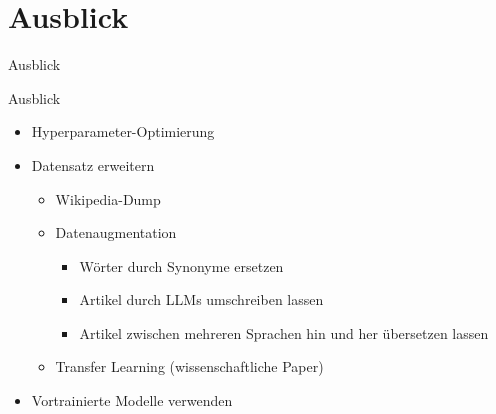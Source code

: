 \documentclass[aspectratio=169]{beamer} %
\begin{document}
\section{Ausblick}
\begin{frame}{Ausblick}
    \begin{block}{Ausblick}
        \begin{itemize}
            \item Hyperparameter-Optimierung

            \item Datensatz erweitern
            \begin{itemize}
                \item Wikipedia-Dump
                
                \item Datenaugmentation
                \begin{itemize}
                    \item W\"orter durch Synonyme ersetzen

                    \item Artikel durch LLMs umschreiben lassen

                    \item Artikel zwischen mehreren Sprachen hin und her \"ubersetzen lassen
                \end{itemize}
                
                \item Transfer Learning (wissenschaftliche Paper)
            \end{itemize}

            \item Vortrainierte Modelle verwenden
        \end{itemize}
    \end{block}
\end{frame}
\end{document}
